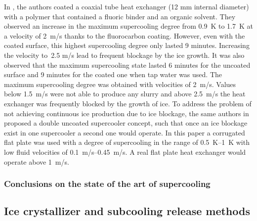 In \cite{wang_experimental_2012}, the authors coated  a coaxial tube heat exchanger (12 mm internal diameter) with a polymer that contained a fluoric binder and an organic solvent. They observed an increase in the maximum supercooling degree from 0.9~K to 1.7~K at a velocity of 2~m/s thanks to the fluorocarbon coating. However, even with the coated surface, this highest supercooling degree only lasted 9 minutes. Increasing the velocity to~2.5 m/s lead to frequent blockage by the ice growth.
It was also observed that the maximum supercooling state lasted 6 minutes for the uncoated surface and 9 minutes for the coated one when tap water was used.
The maximum supercooling degree was obtained with velocities of 2~m/s. Values below 1.5~m/s were not able to produce any slurry and above 2.5~m/s the heat exchanger was frequently blocked by the growth of ice.
To address the problem of not achieving continuous ice production  due to ice blockage, the same authors in \cite{wang_investigation_2016} proposed a double uncoated supercooler concept, such that once an ice blockage exist in one supercooler a second one would operate. In this paper a corrugated flat plate was used with a degree of supercooling in the range of \SIrange{0.5}{1}{K} with low fluid velocities of \SIrange{0.1}{0.45}{m/s}. A real flat plate heat exchanger would operate above 1~m/s.


\subsubsection{Conclusions on the state of the art of supercooling}



\subsection{Ice crystallizer and subcooling release methods}
\label{section_lit_review_ice_crystalizer}


